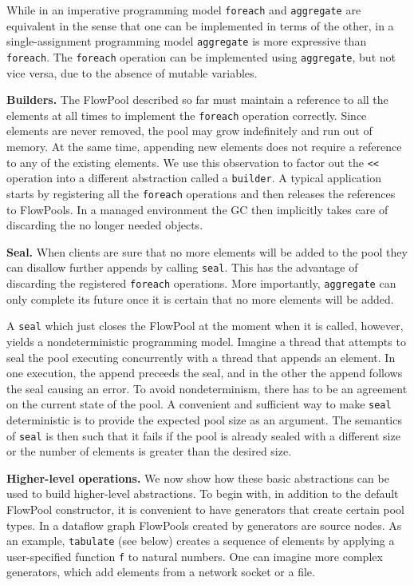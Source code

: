 \documentclass[runningheads,a4paper]{llncs}
\begin{document}
While in an imperative programming model \verb=foreach= and \verb=aggregate= are
equivalent in the sense that one can be implemented in terms of the
other, in a single-assignment programming model \verb=aggregate= is more
expressive than \verb=foreach=.
The \verb=foreach= operation can be implemented using \verb=aggregate=, but not vice versa,
due to the absence of mutable variables.

\textbf{Builders.}
The FlowPool described so far must maintain a reference 
to all the elements at all times to implement the \verb=foreach=
operation correctly.
Since elements are never removed, the pool may grow indefinitely
and run out of memory.
At the same time, appending new elements does not require a reference
to any of the existing elements.
We use this observation to factor out the \verb=<<= operation into
a different abstraction called a \verb=builder=.
A typical application starts by registering all the \verb=foreach=
operations and then releases the references to FlowPools.
In a managed environment the GC then implicitly takes care of
discarding the no longer needed objects.


\textbf{Seal.}
When clients are sure that no more elements will be added to the pool
they can disallow further appends by calling \verb=seal=.
This has the advantage of discarding the registered \verb=foreach=
operations.
More importantly, \verb=aggregate= can only complete its future
once it is certain that no more elements will be added.

A \verb=seal= which just closes the FlowPool at the moment when it
is called, however, yields a nondeterministic programming model.
Imagine a thread that attempts to seal the pool executing concurrently
with a thread that appends an element.
In one execution, the append preceeds the seal, and in the other
the append follows the seal causing an error.
To avoid nondeterminism, there has to be an agreement on the
current state of the pool.
A convenient and sufficient way to make \verb=seal= deterministic
is to provide the expected pool size as an argument.
The semantics of \verb=seal= is then such that it fails if the pool
is already sealed with a different size or the number of elements
is greater than the desired size.

\textbf{Higher-level operations.}
We now show how these basic abstractions can be used
to build higher-level abstractions.
To begin with, in addition to the default FlowPool constructor, it is
convenient to have generators that create certain pool types.
In a dataflow graph FlowPools created by generators
are source nodes.
As an example, \verb=tabulate= (see below) creates a sequence of elements
by applying a user-specified function \verb=f= to natural numbers.
One can imagine more complex generators, which add elements from a
network socket or a file.
\end{document}

